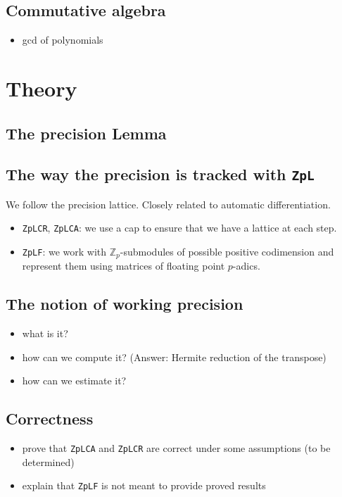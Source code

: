 \documentclass[sigconf]{acmart}
\newcommand{\Z}{\mathbb Z}
\newcommand{\Zp}{\Z_p}
\newcommand{\ZpL}{\texttt{ZpL}\xspace}
\newcommand{\ZpLCA}{\texttt{ZpLCA}\xspace}
\newcommand{\ZpLCR}{\texttt{ZpLCR}\xspace}
\newcommand{\ZpLF}{\texttt{ZpLF}\xspace}
\theoremstyle{definition}
\begin{document}
\subsection{Commutative algebra}

\begin{itemize}
\item gcd of polynomials
\end{itemize}

\section{Theory}

\subsection{The precision Lemma}

\subsection{The way the precision is tracked with \ZpL}

We follow the precision lattice.
Closely related to automatic differentiation.

\begin{itemize}
\item \ZpLCR, \ZpLCA: we use a cap to ensure that we have a lattice at
each step.
\item \ZpLF: we work with $\Zp$-submodules of possible positive codimension
and represent them using matrices of floating point $p$-adics.
\end{itemize}

\subsection{The notion of working precision}

\begin{itemize}
\item what is it?
\item how can we compute it? (Answer: Hermite reduction of the transpose)
\item how can we estimate it?
\end{itemize}

\subsection{Correctness}

\begin{itemize}
\item prove that \ZpLCA and \ZpLCR are correct under some assumptions
(to be determined)
\item explain that \ZpLF is not meant to provide proved results
\end{itemize}
\end{document}
